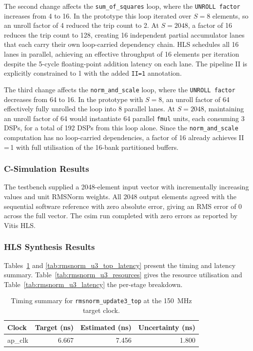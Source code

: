 The second change affects the \texttt{sum\_of\_squares} loop, where the
\texttt{UNROLL factor} increases from 4 to 16. In the prototype this loop
iterated over $S = 8$ elements, so an unroll factor of 4 reduced the trip
count to 2. At $S = 2048$, a factor of 16 reduces the trip count to 128,
creating 16 independent partial accumulator lanes that each carry their own
loop-carried dependency chain. HLS schedules all 16 lanes in parallel,
achieving an effective throughput of 16 elements per iteration despite the
5-cycle floating-point addition latency on each lane. The pipeline II
is explicitly constrained to 1 with the added \texttt{II=1} annotation.

The third change affects the \texttt{norm\_and\_scale} loop, where the
\texttt{UNROLL factor} decreases from 64 to 16. In the prototype with
$S = 8$, an unroll factor of 64 effectively fully unrolled the loop into
8 parallel lanes. At $S = 2048$, maintaining
an unroll factor of 64 would instantiate 64 parallel \texttt{fmul} units,
each consuming 3 DSPs, for a total of 192 DSPs from this loop alone. Since
the \texttt{norm\_and\_scale} computation has no loop-carried dependencies,
a factor of 16 already achieves II\,=\,1 with full utilisation of the 16-bank
partitioned buffers.

\subsubsection{C-Simulation Results}
\label{subsubsec:rmsnorm_update3_csim}

The testbench supplied a 2048-element input vector with incrementally
increasing values and unit RMSNorm weights. All 2048 output elements
agreed with the sequential software reference with zero absolute error,
giving an RMS error of $0$ across the full vector. The csim run completed
with zero errors as reported by Vitis HLS.

\subsubsection{HLS Synthesis Results}
\label{subsubsec:rmsnorm_update3_csyn}

Tables~\ref{tab:rmsnorm_u3_timing} and \ref{tab:rmsnorm_u3_top_latency}
present the timing and latency summary. Table~\ref{tab:rmsnorm_u3_resources}
gives the resource utilisation and Table~\ref{tab:rmsnorm_u3_latency} the
per-stage breakdown.

\begin{table}[H]
  \centering
  \begin{tabular}{lrrr}
    \toprule
    Clock & Target (ns) & Estimated (ns) & Uncertainty (ns) \\
    \midrule
    ap\_clk & 6.667 & 7.456 & 1.800 \\
    \bottomrule
  \end{tabular}
  \caption{Timing summary for \texttt{rmsnorm\_update3\_top} at the
           \SI{150}{\mega\hertz} target clock.}
  \label{tab:rmsnorm_u3_timing}
\end{table}


